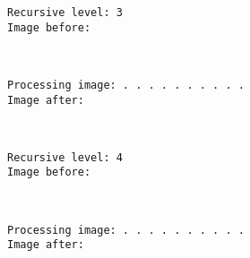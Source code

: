 \documentclass[11pt]{article}
\begin{document}
    \begin{Verbatim}[commandchars=\\\{\}]
Recursive level: 3
Image before:

    \end{Verbatim}

    \begin{center}
    \end{center}
    { \hspace*{\fill} \\}
    
    \begin{Verbatim}[commandchars=\\\{\}]
Processing image: . . . . . . . . . . 
Image after:

    \end{Verbatim}

    \begin{center}
    \end{center}
    { \hspace*{\fill} \\}
    
    \begin{Verbatim}[commandchars=\\\{\}]
Recursive level: 4
Image before:

    \end{Verbatim}

    \begin{center}
    \end{center}
    { \hspace*{\fill} \\}
    
    \begin{Verbatim}[commandchars=\\\{\}]
Processing image: . . . . . . . . . . 
Image after:

    \end{Verbatim}

    \begin{center}
    \end{center}
    { \hspace*{\fill} \\}
    
\end{document}
